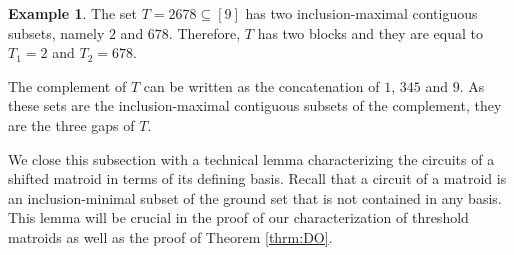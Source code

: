 \documentclass[10pt,a4paper]{amsart}
\theoremstyle{definition}
\newtheorem{example}[defn]{Example}
\theoremstyle{plain}
\begin{document}
\begin{example}
The set $T= 2678\subseteq [9]$ has two inclusion-maximal contiguous subsets, namely $2$ and $678$. Therefore, $T$ has two blocks and they are equal to $T_1=2$ and $T_2=678$.

The complement of $T$ can be written as the concatenation of $1$, $345$ and $9$. As these sets are the inclusion-maximal contiguous subsets of the complement, they are the three gaps of $T$.
\end{example}


We close this subsection with a technical lemma characterizing the circuits of a shifted matroid in terms of its defining basis. Recall that a circuit of a matroid is an inclusion-minimal subset of the ground set that is not contained in any basis. This lemma will be crucial in the proof of our characterization of threshold matroids as well as the proof of Theorem \ref{thrm:DO}.
\end{document}
